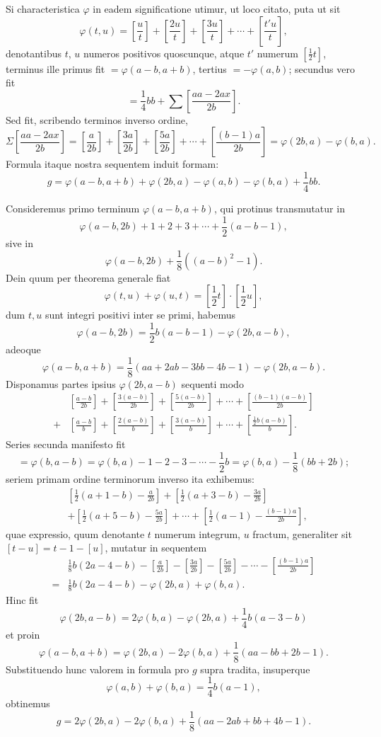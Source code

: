 \documentclass[12pt]{article}
\newcommand{\gbrack}[1]{\left[#1\right]}
\begin{document}
Si characteristica $\varphi$ in eadem significatione utimur, ut loco citato, puta ut sit
\[
\varphi(t,u)=\gbrack{\frac{u}{t}}+\gbrack{\frac{2u}{t}}+\gbrack{\frac{3u}{t}}+\cdots+\gbrack{\frac{t'u}{t}},
\]
denotantibus $t$, $u$ numeros positivos quoscunque, atque $t'$ numerum $\gbrack{\frac12t}$, terminus ille primus fit $=\varphi(a-b,a+b)$, tertius $=-\varphi(a,b)$; secundus vero fit
\[
=\frac14bb+\sum\gbrack{\frac{aa-2ax}{2b}}.
\]
Sed fit, scribendo terminos inverso ordine,
\[
\Sigma\gbrack{\frac{aa-2ax}{2b}}
=\gbrack{\frac{a}{2b}}+\gbrack{\frac{3a}{2b}}+\gbrack{\frac{5a}{2b}}+\cdots+\gbrack{\frac{(b-1)a}{2b}}
=\varphi(2b,a)-\varphi(b,a).
\]
Formula itaque nostra sequentem induit formam:
\[
g=\varphi(a-b,a+b)+\varphi(2b,a)-\varphi(a,b)-\varphi(b,a)+\frac14bb.
\]

Consideremus primo terminum $\varphi(a-b,a+b)$, qui protinus transmutatur in
\[
\varphi(a-b,2b)+1+2+3+\cdots+\frac12(a-b-1),
\]
sive in
\[
\varphi(a-b,2b)+\frac18((a-b)^2-1).
\]
Dein quum per theorema generale fiat
\[
\varphi(t,u)+\varphi(u,t)=\gbrack{\frac12t}\cdot\gbrack{\frac12u},
\]
dum $t,u$ sunt integri positivi inter se primi, habemus
\[
\varphi(a-b,2b)=\frac12b(a-b-1)-\varphi(2b,a-b),
\]
adeoque
\[
\varphi(a-b,a+b)=\frac18(aa+2ab-3bb-4b-1)-\varphi(2b,a-b).
\]
Disponamus partes ipsius $\varphi(2b,a-b)$ sequenti modo
\[
\begin{aligned}
&\gbrack{\frac{a-b}{2b}}+\gbrack{\frac{3(a-b)}{2b}}+\gbrack{\frac{5(a-b)}{2b}}+\cdots+\gbrack{\frac{(b-1)(a-b)}{2b}}\\
+{}&\gbrack{\frac{a-b}{b}}+\gbrack{\frac{2(a-b)}{b}}+\gbrack{\frac{3(a-b)}{b}}+\cdots+\gbrack{\frac{\frac12b(a-b)}{b}}.
\end{aligned}
\]
Series secunda manifesto fit
\[
=\varphi(b,a-b)=\varphi(b,a)-1-2-3-\cdots-\frac12b
=\varphi(b,a)-\frac18(bb+2b);
\]
seriem primam ordine terminorum inverso ita exhibemus:
\[
\begin{aligned}
&\gbrack{\frac12(a+1-b)-\frac{a}{2b}}
+\gbrack{\frac12(a+3-b)-\frac{3a}{2b}}\\
&+\gbrack{\frac12(a+5-b)-\frac{5a}{2b}}
+\cdots+\gbrack{\frac12(a-1)-\frac{(b-1)a}{2b}},
\end{aligned}
\]
quae expressio, quum denotante $t$ numerum integrum, $u$ fractum, generaliter sit $[t-u]=t-1-[u]$, mutatur in sequentem
\[
\begin{aligned}
&\frac18b(2a-4-b)-\gbrack{\frac{a}{2b}}-\gbrack{\frac{3a}{2b}}
-\gbrack{\frac{5a}{2b}}-\cdots-\gbrack{\frac{(b-1)a}{2b}}\\
={}&\frac18b(2a-4-b)-\varphi(2b,a)+\varphi(b,a).
\end{aligned}
\]
Hinc fit
\[
\varphi(2b,a-b)=2\varphi(b,a)-\varphi(2b,a)+\frac14b(a-3-b)
\]
et proin
\[
\varphi(a-b,a+b)=\varphi(2b,a)-2\varphi(b,a)+\frac18(aa-bb+2b-1).
\]
Substituendo hunc valorem in formula pro $g$ supra tradita, insuperque
\[
\varphi(a,b)+\varphi(b,a)=\frac14b(a-1),
\]
obtinemus
\[
g=2\varphi(2b,a)-2\varphi(b,a)+\frac18(aa-2ab+bb+4b-1).
\]
\end{document}

